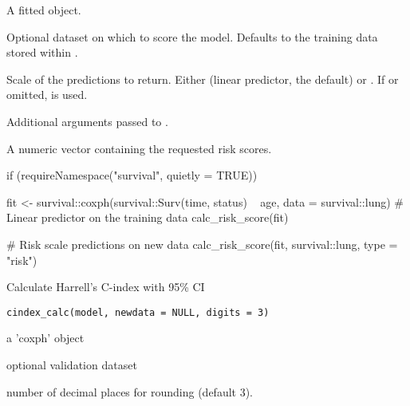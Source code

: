 \documentclass[letterpaper]{book}
\begin{document}
%
\begin{Arguments}
\begin{ldescription}
\item[\code{model}] A fitted  object.

\item[\code{data}] Optional dataset on which to score the model. Defaults to the
training data stored within .

\item[\code{type}] Scale of the predictions to return. Either  (linear
predictor, the default) or . If  or omitted,  is used.

\item[\code{...}] Additional arguments passed to .
\end{ldescription}
\end{Arguments}
%
\begin{Value}
A numeric vector containing the requested risk scores.
\end{Value}
%
\begin{Examples}
\begin{ExampleCode}
if (requireNamespace("survival", quietly = TRUE)) {
  fit <- survival::coxph(survival::Surv(time, status) ~ age, data = survival::lung)
  # Linear predictor on the training data
  calc_risk_score(fit)

  # Risk scale predictions on new data
  calc_risk_score(fit, survival::lung, type = "risk")
}
\end{ExampleCode}
\end{Examples}
%
\begin{Description}
Calculate Harrell's C-index with 95\% CI
\end{Description}
%
\begin{Usage}
\begin{verbatim}
cindex_calc(model, newdata = NULL, digits = 3)
\end{verbatim}
\end{Usage}
%
\begin{Arguments}
\begin{ldescription}
\item[\code{model}] a 'coxph' object

\item[\code{newdata}] optional validation dataset

\item[\code{digits}] number of decimal places for rounding (default 3).
\end{ldescription}
\end{Arguments}
\end{document}
